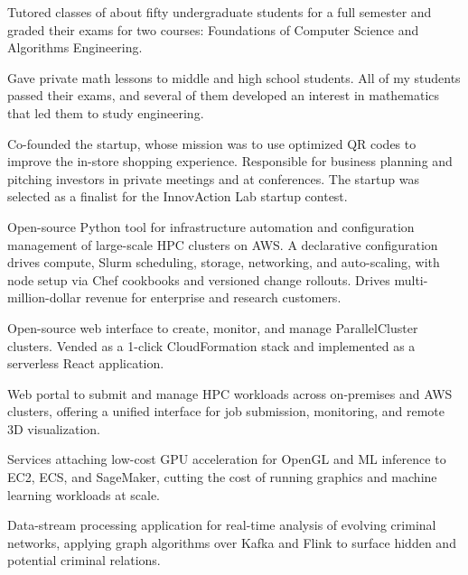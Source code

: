 {Tutored classes of about fifty undergraduate students for a full semester and graded
their exams for two courses: Foundations of Computer Science and Algorithms Engineering.}

{Gave private math lessons to middle and high school students. 
All of my students passed their exams, and several of them developed an interest in mathematics that led them to study engineering.}

{Co-founded the startup, whose mission was to use optimized QR codes to improve the in-store shopping experience.
Responsible for business planning and pitching investors in private meetings and at conferences.
The startup was selected as a finalist for the InnovAction Lab startup contest.}

{Open-source Python tool for infrastructure automation and configuration management
of large-scale HPC clusters on AWS. A declarative configuration drives compute, Slurm
scheduling, storage, networking, and auto-scaling, with node setup via Chef cookbooks and
versioned change rollouts. Drives multi-million-dollar revenue for enterprise and research customers.}

{Open-source web interface to create, monitor, and manage ParallelCluster clusters.
Vended as a 1-click CloudFormation stack and implemented as a serverless React application.}

{Web portal to submit and manage HPC workloads across on-premises and AWS clusters,
offering a unified interface for job submission, monitoring, and remote 3D
visualization.}

{Services attaching low-cost GPU acceleration for OpenGL and ML inference to EC2,
ECS, and SageMaker, cutting the cost of running graphics and machine learning
workloads at scale.}

{Data-stream processing application for real-time analysis of evolving criminal
networks, applying graph algorithms over Kafka and Flink to surface hidden and
potential criminal relations.}

